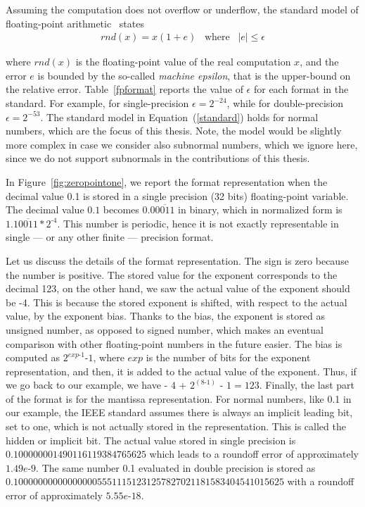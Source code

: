 Assuming the computation does not overflow or underflow, the standard model of floating-point arithmetic~\cite{every} states
%
\begin{align}
rnd(x)=x(1+e)\;\;\;\text{where}\;\;\;|e|\leq\epsilon
\label{standard}
\end{align}
%

where $rnd(x)$ is the floating-point value of the real computation $x$, and the error $e$ is bounded by the so-called \emph{machine epsilon}, that is the upper-bound on the relative error.
%
Table~\ref{fpformat} reports the value of $\epsilon$ for each format in the standard.
%
For example, for single-precision $\epsilon=2^{-24}$, while for double-precision $\epsilon=2^{-53}$.
%
The standard model in Equation~(\ref{standard}) holds for normal numbers, which are the focus of this thesis.
%
Note, the model would be slightly more complex in case we consider also subnormal numbers, which we ignore here, since we do not support subnormals in the contributions of this thesis.
%

In Figure~\ref{fig:zeropointone}, we report the format representation when the decimal value 0.1 is stored in a single precision (32 bits) floating-point variable.
%
The decimal value $0.1$ becomes $0.0\overline{0011}$ in binary, which in normalized form is $1.1\overline{0011}*2^{\text{-}4}$.
%
This number is periodic, hence it is not exactly representable in single --- or any other finite --- precision format.
%

Let us discuss the details of the format representation.
%
The sign is zero because the number is positive.
%
The stored value for the exponent corresponds to the decimal 123, on the other hand, we saw the actual value of the exponent should be -4.
%
This is because the stored exponent is shifted, with respect to the actual value, by the exponent bias. 
%
Thanks to the bias, the exponent is stored as unsigned number, as opposed to signed number, which makes an eventual comparison with other floating-point numbers in the future easier.
%
The bias is computed as $2^{exp\text{-}1}\text{-}1$, where $exp$ is the number of bits for the exponent representation, and then, it is added to the actual value of the exponent.
%
Thus, if we go back to our example, we have $\text{- }4\text{ + }2^{(8\text{-}1)}\text{ - }1=123$.
%
Finally, the last part of the format is for the mantissa representation. 
%
For normal numbers, like 0.1 in our example, the IEEE standard assumes there is always an implicit leading bit, set to one, which is not actually stored in the representation.
%
%
This is called the hidden or implicit bit.
%
The actual value stored in single precision is $0.100000001490116119384765625$ which leads to a roundoff error of approximately $1.49e\text{-}9$.
%
The same number 0.1 evaluated in double precision is stored as \\ $0.1000000000000000055511151231257827021181583404541015625$ with a roundoff error of approximately $5.55e\text{-}18$.
%

